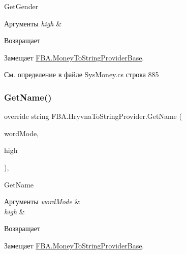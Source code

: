 Get\+Gender 


\begin{DoxyParams}{Аргументы}
{\em high} & \\
\hline
\end{DoxyParams}
\begin{DoxyReturn}{Возвращает}

\end{DoxyReturn}


Замещает \mbox{\hyperlink{class_f_b_a_1_1_money_to_string_provider_base_a24e1e1dcd1a4c42773d3ec0034a4ca6d}{F\+B\+A.\+Money\+To\+String\+Provider\+Base}}.



См. определение в файле Sys\+Money.\+cs строка 885

\mbox{\label{class_f_b_a_1_1_hryvna_to_string_provider_a7e7f7d7ca730dcb617c9218ca91866ef}} 
\subsubsection{\texorpdfstring{Get\+Name()}{GetName()}}
{\footnotesize\ttfamily override string F\+B\+A.\+Hryvna\+To\+String\+Provider.\+Get\+Name (\begin{DoxyParamCaption}\item[{Number\+To\+Russian\+String.\+Word\+Mode}]{word\+Mode,  }\item[{bool}]{high }\end{DoxyParamCaption})\hspace{0.3cm}{\ttfamily [protected]}, {\ttfamily [virtual]}}



Get\+Name 


\begin{DoxyParams}{Аргументы}
{\em word\+Mode} & \\
\hline
{\em high} & \\
\hline
\end{DoxyParams}
\begin{DoxyReturn}{Возвращает}

\end{DoxyReturn}


Замещает \mbox{\hyperlink{class_f_b_a_1_1_money_to_string_provider_base_aea712eaf4a5d84eed5624e3d48988502}{F\+B\+A.\+Money\+To\+String\+Provider\+Base}}.



